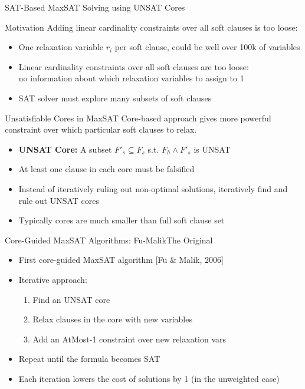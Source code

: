 \documentclass[t,english]{sdqbeamer}
\begin{document}
\begin{frame}{SAT-Based MaxSAT Solving using UNSAT Cores}
\vspace{-2em}
\begin{block}{Motivation}
Adding linear cardinality constraints over all soft clauses is too loose:
\begin{itemize}\itemsep1ex
	\item One relaxation variable $r_i$ per soft clause, could be well over 100k of variables
	\item Linear cardinality constraints over all soft clauses are too loose:\\
	no information about which relaxation variables to assign to 1
	\item SAT solver must explore many subsets of soft clauses
\end{itemize}
\end{block}
\begin{block}{Unsatisfiable Cores in MaxSAT}
Core-based approach gives more powerful constraint over which particular soft clauses to relax.
\begin{itemize}\itemsep1ex
	\item \textbf{UNSAT Core:} A subset $F'_s \subseteq F_s$ s.t. $F_h \wedge F'_s$ is UNSAT
	\item At least one clause in each core must be falsified
	\item Instead of iteratively ruling out non-optimal solutions, iteratively find and rule out UNSAT cores
	\item Typically cores are much smaller than full soft clause set
\end{itemize}
\end{block}
\end{frame}

\begin{frame}{Core-Guided MaxSAT Algorithms: Fu-Malik}{The Original}
\begin{itemize}\itemsep1em
	\item First core-guided MaxSAT algorithm [Fu \& Malik, 2006]
	\item Iterative approach:
	\begin{enumerate}\itemsep1ex
		\item Find an UNSAT core
		\item Relax clauses in the core with new variables
		\item Add an AtMost-1 constraint over new relaxation vars
	\end{enumerate}
	\item Repeat until the formula becomes SAT
	\item Each iteration lowers the cost of solutions by 1 (in the unweighted case)
\end{itemize}
\end{frame}
\end{document}
